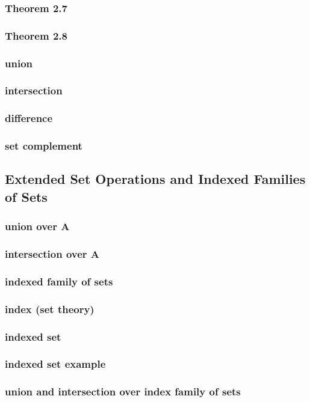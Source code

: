 \documentclass[a4paper]{article}
\begin{document}
\subsubsection*{Theorem 2.7}
\subsubsection*{Theorem 2.8}
\subsubsection*{union}
\subsubsection*{intersection}
\subsubsection*{difference}
\subsubsection*{set complement}

\newpage
\subsection{Extended Set Operations and Indexed Families of Sets}   %
\subsubsection*{union over A}
\subsubsection*{intersection over A}
\subsubsection*{indexed family of sets}
\subsubsection*{index (set theory)}
\subsubsection*{indexed set}
\subsubsection*{indexed set example}
\subsubsection*{union and intersection over index family of sets}
\end{document}
